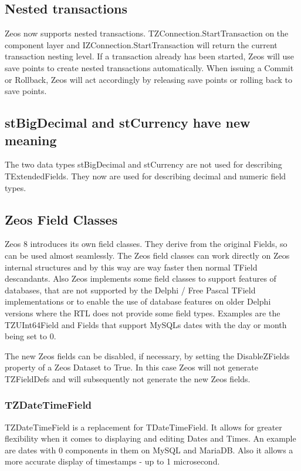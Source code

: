 \documentclass[a4paper,12pt,oneside]{report}
\begin{document}
\subsection{Nested transactions}
Zeos now supports nested transactions. TZConnection.StartTransaction on the component layer and IZConnection.StartTransaction will return the current transaction nesting level.
If a transaction already has been started, Zeos will use save points to create nested transactions automatically.
When issuing a Commit or Rollback, Zeos will act accordingly by releasing save points or rolling back to save points.

\subsection{stBigDecimal and stCurrency have new meaning}
The two data types stBigDecimal and stCurrency are not used for describing TExtendedFields.
They now are used for describing decimal and numeric field types.

\subsection{Zeos Field Classes}
Zeos 8 introduces its own field classes.
They derive from the original Fields, so can be used almost seamlessly.
The Zeos field classes can work directly on Zeos internal structures and by this way are way faster then normal TField descandants.
Also Zeos implements some field classes to support features of databases, that are not supported by the Delphi / Free Pascal TField implementations or to enable the use of database features on older Delphi versions where the RTL does not provide some field types.
Examples are the TZUInt64Field and Fields that support MySQLs dates with the day or month being set to 0.

The new Zeos fields can be disabled, if necessary, by setting the DisableZFields property of a Zeos Dataset to True.
In this case Zeos will not generate TZFieldDefs and will subsequently not generate the new Zeos fields.

\subsubsection{TZDateTimeField}
TZDateTimeField is a replacement for TDateTimeField.
It allows for greater flexibility when it comes to displaying and editing Dates and Times.
An example are dates with 0 components in them on MySQL and MariaDB.
Also it allows a more accurate display of timestamps - up to 1 microsecond.
\end{document}
